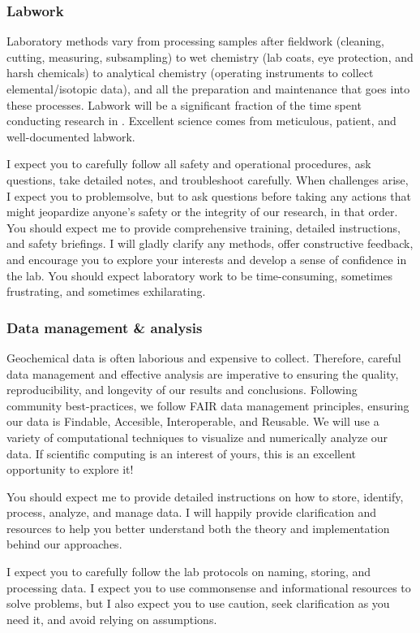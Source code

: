 \subsubsection{Labwork}
Laboratory methods vary from processing samples after fieldwork (cleaning, cutting, measuring, subsampling) to wet chemistry (lab coats, eye protection, and harsh chemicals) to analytical chemistry (operating instruments to collect elemental/isotopic data), and all the preparation and maintenance that goes into these processes.
Labwork will be a significant fraction of the time spent conducting research in \grackle.
Excellent science comes from meticulous, patient, and well-documented labwork.

I expect you to carefully follow all safety and operational procedures, ask questions, take detailed notes, and troubleshoot carefully. 
When challenges arise, I expect you to problemsolve, but to ask questions before taking any actions that might jeopardize anyone's safety or the integrity of our research, in that order.
You should expect me to provide comprehensive training, detailed instructions, and safety briefings.
I will gladly clarify any methods, offer constructive feedback, and encourage you to explore your interests and develop a sense of confidence in the lab.
You should expect laboratory work to be time-consuming, sometimes frustrating, and sometimes exhilarating. 

\subsubsection{Data management \& analysis}
Geochemical data is often laborious and expensive to collect. 
Therefore, careful data management and effective analysis are imperative to ensuring the quality, reproducibility, and longevity of our results and conclusions.
Following community best-practices, we follow FAIR data management principles, ensuring our data is Findable, Accesible, Interoperable, and Reusable. 
We will use a variety of computational techniques to visualize and numerically analyze our data. 
If scientific computing is an interest of yours, this is an excellent opportunity to explore it!

You should expect me to provide detailed instructions on how to store, identify, process, analyze, and manage data. 
I will happily provide clarification and resources to help you better understand both the theory and implementation behind our approaches.

I expect you to carefully follow the lab protocols on naming, storing, and processing data. 
I expect you to use commonsense and informational resources to solve problems, but I also expect you to use caution, seek clarification as you need it, and avoid relying on assumptions.


